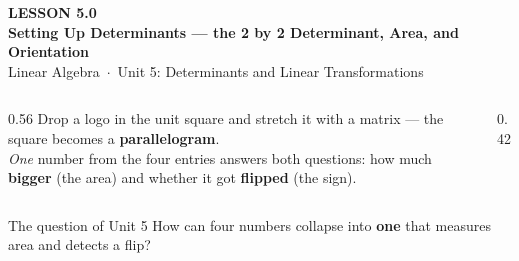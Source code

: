 \documentclass[aspectratio=169, 11pt]{beamer}
\begin{document}
{
\begin{frame}[plain]
  \vspace{2.8cm}\hspace{0.55cm}%
  \begin{minipage}{0.9\textwidth}
    {\color{goldacc}\bfseries\small LESSON 5.0}\\[0.5cm]
    {\color{white}\bfseries\LARGE Setting Up Determinants --- the 2 by 2 Determinant, Area, and Orientation}\\[1.0cm]
    {\color{blushmid}\small Linear Algebra~$\cdot$~Unit 5: Determinants and Linear Transformations}
  \end{minipage}
\end{frame}
}

\begin{frame}[t, plain]
  \begin{columns}[T]
    \begin{column}{0.56\textwidth}
      Drop a logo in the unit square and stretch it with a matrix --- the square becomes a
      \textbf{parallelogram}.\\[8pt]
      \emph{One} number from the four entries answers both questions: how much \textbf{bigger}
      (the area) and whether it got \textbf{flipped} (the sign).
    \end{column}
    \begin{column}{0.42\textwidth}
      \centering
    \end{column}
  \end{columns}
  \vspace{4pt}
  \begin{block}{The question of Unit 5}
    How can four numbers collapse into \textbf{one} that measures area and detects a flip?
  \end{block}
\end{frame}
\end{document}
